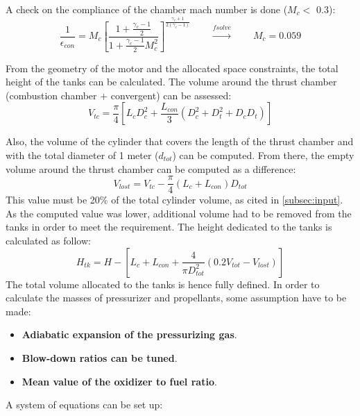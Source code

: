 A check on the compliance of the chamber mach number is done ($M_c <$ 0.3):
\begin{equation}    
    \frac{1}{\epsilon_{con}} = M_c \left[ \frac{1 + \frac{\gamma_c - 1}{2}}{1 + \frac{\gamma_c - 1}{2} M_c^2} \right]^{\frac{\gamma_c + 1}{2(\gamma_c - 1)}}
    \qquad \xrightarrow{\textit{fsolve}} \qquad M_c = 0.059
\end{equation}

From the geometry of the motor and the allocated space constraints, the total height of the tanks can be calculated. The volume around the thrust chamber (combustion chamber + convergent) can be assessed:
\begin{equation}
    V_{tc} = \frac{\pi}{4} \left[L_c D_c^2  + \frac{L_{con}}{3} \left(D_c^2 + D_t^2 + D_c D_t\right)\right]
    \label{eq:v_tc}
\end{equation}

Also, the volume of the cylinder that covers the length of the thrust chamber and with the total diameter of 1 meter ($d_{tot}$) can be computed. From there, the empty volume around the thrust chamber can be computed as a difference:
\begin{equation}
    V_{lost} =  V_{tc} - \frac{\pi}{4} \left(L_{c} + L_{con}\right) D_{tot}
\end{equation}
This value must be 20\% of the total cylinder volume, as cited in \autoref{subsec:input}. As the computed value was lower, additional volume had to be removed from the tanks in order to meet the requirement. The height dedicated to the tanks is calculated as follow:
\begin{equation}
    H_{tk} =  H - \left[L_{c} + L_{con} + \frac{4}{\pi D_{tot}^2}\left( 0.2 V_{tot} - V_{lost}\right) \right]
\end{equation}
The total volume allocated to the tanks is hence fully defined. 
In order to calculate the masses of pressurizer and propellants, some assumption have to be made:
\begin{itemize}
    \item \textbf{Adiabatic expansion of the pressurizing gas}.
    \item \textbf{Blow-down ratios can be tuned}.
    \item \textbf{Mean value of the oxidizer to fuel ratio}.
\end{itemize}

A system of equations can be set up:


